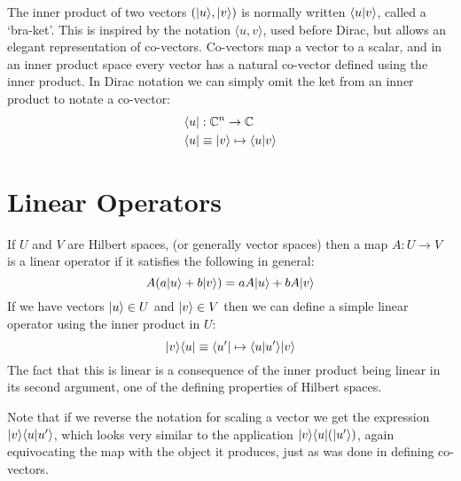 The inner product of two vectors $(| u \rangle, | v \rangle)$ is normally written $\langle u | v \rangle$, called a `bra-ket'. This is inspired by the notation $\langle u, v\rangle$, used before Dirac, but allows an elegant representation of co-vectors. Co-vectors map a vector to a scalar, and in an inner product space every vector has a natural co-vector defined using the inner product. In Dirac notation we can simply omit the ket from an inner product to notate a co-vector:
\begin{align*}
\langle u | &: \mathbb{C}^n \to \mathbb{C}
\\\langle u | &\equiv | v \rangle \mapsto \langle u | v \rangle
\end{align*}

\section{Linear Operators}
If $U$ and $V$ are Hilbert spaces, (or generally vector spaces) then a map $A: U \to V$ is a linear operator if it satisfies the following in general:
\[A(a| u \rangle + b| v \rangle) = aA| u \rangle + bA| v \rangle\]
If we have vectors $| u \rangle \in U$ and $| v \rangle \in V$ then we can define a simple linear operator using the inner product in $U$:
\[| v \rangle\langle u | \equiv \langle u' | \mapsto \langle u | u' \rangle| v \rangle\]
The fact that this is linear is a consequence of the inner product being linear in its second argument, one of the defining properties of Hilbert spaces.

Note that if we reverse the notation for scaling a vector we get the expression $| v \rangle\langle u | u' \rangle$, which looks very similar to the application $| v \rangle\langle u |(| u' \rangle)$, again equivocating the map with the object it produces, just as was done in defining co-vectors.


